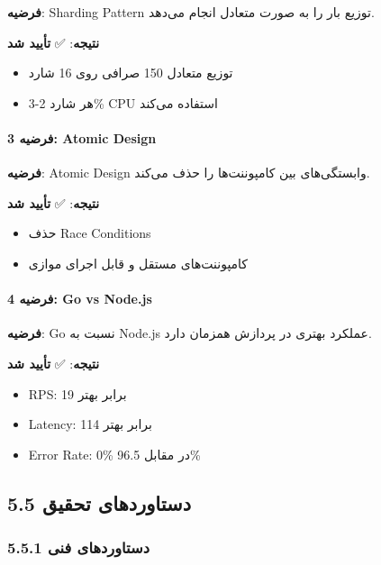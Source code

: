 \documentclass[
]{article}
\providecommand{\tightlist}{%
  \setlength{\itemsep}{0pt}\setlength{\parskip}{0pt}}
\begin{document}
\textbf{فرضیه}: Sharding Pattern توزیع بار را به صورت متعادل انجام
می‌دهد.

\textbf{نتیجه}: ✅ \textbf{تأیید شد}

\begin{itemize}
\tightlist
\item
  توزیع متعادل 150 صرافی روی 16 شارد
\item
  هر شارد 2-3\% CPU استفاده می‌کند
\end{itemize}

\paragraph{فرضیه 3: Atomic
Design}\label{ux641ux631ux636ux6ccux647-3-atomic-design}

\textbf{فرضیه}: Atomic Design وابستگی‌های بین کامپوننت‌ها را حذف می‌کند.

\textbf{نتیجه}: ✅ \textbf{تأیید شد}

\begin{itemize}
\tightlist
\item
  حذف Race Conditions
\item
  کامپوننت‌های مستقل و قابل اجرای موازی
\end{itemize}

\paragraph{فرضیه 4: Go vs
Node.js}\label{ux641ux631ux636ux6ccux647-4-go-vs-node.js}

\textbf{فرضیه}: Go نسبت به Node.js عملکرد بهتری در پردازش همزمان دارد.

\textbf{نتیجه}: ✅ \textbf{تأیید شد}

\begin{itemize}
\tightlist
\item
  RPS: 19 برابر بهتر
\item
  Latency: 114 برابر بهتر
\item
  Error Rate: 0\% در مقابل 96.5\%
\end{itemize}

\subsection{5.5 دستاوردهای
تحقیق}\label{ux62fux633ux62aux627ux648ux631ux62fux647ux627ux6cc-ux62aux62dux642ux6ccux642}

\subsubsection{5.5.1 دستاوردهای
فنی}\label{ux62fux633ux62aux627ux648ux631ux62fux647ux627ux6cc-ux641ux646ux6cc}
\end{document}
